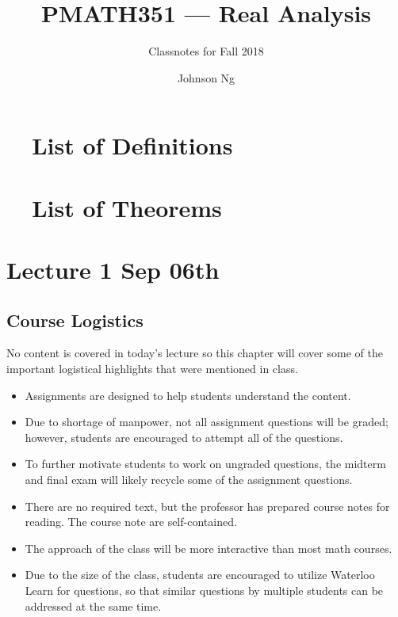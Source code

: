 \documentclass[notoc,notitlepage]{tufte-book}
\title{PMATH351 --- Real Analysis}
\author{Johnson Ng}
\subtitle{Classnotes for Fall 2018}
\begin{document}
\hypersetup{pageanchor=false}
\maketitle
\hypersetup{pageanchor=true}
\tableofcontents

\chapter*{\faBook\ \enspace\ List of Definitions}

\chapter*{\faCoffee\ \enspace\ List of Theorems}

\nocite{bforres2018}

\chapter{Lecture 1 Sep 06th}%
\label{chp:lecture_1_sep_06th}

\section{Course Logistics}%
\label{sec:course_logistics}

No content is covered in today's lecture so this chapter will cover some of the important logistical highlights that were mentioned in class.

\begin{itemize}
  \item Assignments are designed to help students understand the content.
  \item Due to shortage of manpower, not all assignment questions will be graded; however, students are encouraged to attempt all of the questions.
  \item To further motivate students to work on ungraded questions, the midterm and final exam will likely recycle some of the assignment questions.
  \item There are no required text, but the professor has prepared course notes for reading. The course note are self-contained.
  \item The approach of the class will be more interactive than most math courses.
  \item Due to the size of the class, students are encouraged to utilize Waterloo Learn for questions, so that similar questions by multiple students can be addressed at the same time.
\end{itemize}
\end{document}
